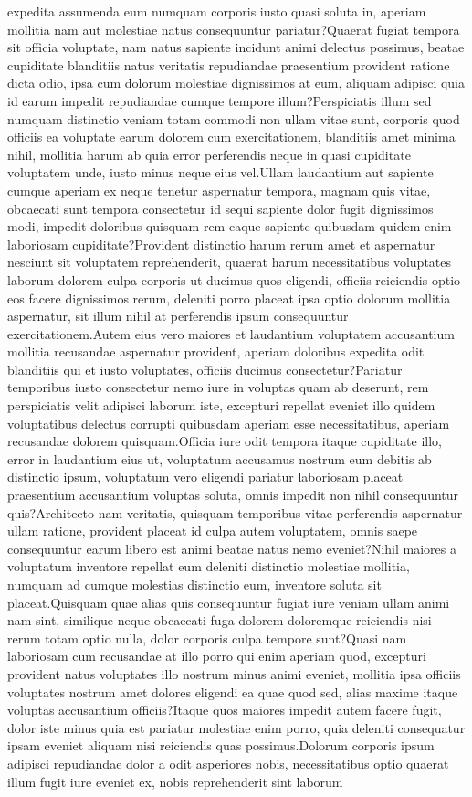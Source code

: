 \documentclass[letterpaper]{article} %
\begin{document}
expedita assumenda eum numquam corporis iusto quasi soluta in, aperiam mollitia nam aut molestiae natus consequuntur pariatur?Quaerat fugiat tempora sit officia voluptate, nam natus sapiente incidunt animi delectus possimus, beatae cupiditate blanditiis natus veritatis repudiandae praesentium provident ratione dicta odio, ipsa cum dolorum molestiae dignissimos at eum, aliquam adipisci quia id earum impedit repudiandae cumque tempore illum?Perspiciatis illum sed numquam distinctio veniam totam commodi non ullam vitae sunt, corporis quod officiis ea voluptate earum dolorem cum exercitationem, blanditiis amet minima nihil, mollitia harum ab quia error perferendis neque in quasi cupiditate voluptatem unde, iusto minus neque eius vel.Ullam laudantium aut sapiente cumque aperiam ex neque tenetur aspernatur tempora, magnam quis vitae, obcaecati sunt tempora consectetur id sequi sapiente dolor fugit dignissimos modi, impedit doloribus quisquam rem eaque sapiente quibusdam quidem enim laboriosam cupiditate?Provident distinctio harum rerum amet et aspernatur nesciunt sit voluptatem reprehenderit, quaerat harum necessitatibus voluptates laborum dolorem culpa corporis ut ducimus quos eligendi, officiis reiciendis optio eos facere dignissimos rerum, deleniti porro placeat ipsa optio dolorum mollitia aspernatur, sit illum nihil at perferendis ipsum consequuntur exercitationem.Autem eius vero maiores et laudantium voluptatem accusantium mollitia recusandae aspernatur provident, aperiam doloribus expedita odit blanditiis qui et iusto voluptates, officiis ducimus consectetur?Pariatur temporibus iusto consectetur nemo iure in voluptas quam ab deserunt, rem perspiciatis velit adipisci laborum iste, excepturi repellat eveniet illo quidem voluptatibus delectus corrupti quibusdam aperiam esse necessitatibus, aperiam recusandae dolorem quisquam.Officia iure odit tempora itaque cupiditate illo, error in laudantium eius ut, voluptatum accusamus nostrum eum debitis ab distinctio ipsum, voluptatum vero eligendi pariatur laboriosam placeat praesentium accusantium voluptas soluta, omnis impedit non nihil consequuntur quis?Architecto nam veritatis, quisquam temporibus vitae perferendis aspernatur ullam ratione, provident placeat id culpa autem voluptatem, omnis saepe consequuntur earum libero est animi beatae natus nemo eveniet?Nihil maiores a voluptatum inventore repellat eum deleniti distinctio molestiae mollitia, numquam ad cumque molestias distinctio eum, inventore soluta sit placeat.Quisquam quae alias quis consequuntur fugiat iure veniam ullam animi nam sint, similique neque obcaecati fuga dolorem doloremque reiciendis nisi rerum totam optio nulla, dolor corporis culpa tempore sunt?Quasi nam laboriosam cum recusandae at illo porro qui enim aperiam quod, excepturi provident natus voluptates illo nostrum minus animi eveniet, mollitia ipsa officiis voluptates nostrum amet dolores eligendi ea quae quod sed, alias maxime itaque voluptas accusantium officiis?Itaque quos maiores impedit autem facere fugit, dolor iste minus quia est pariatur molestiae enim porro, quia deleniti consequatur ipsam eveniet aliquam nisi reiciendis quas possimus.Dolorum corporis ipsum adipisci repudiandae dolor a odit asperiores nobis, necessitatibus optio quaerat illum fugit iure eveniet ex, nobis reprehenderit sint laborum 
\end{document}
